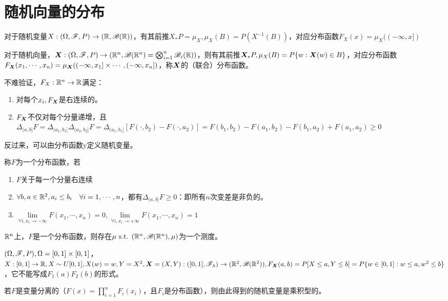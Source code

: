 \documentclass{ctexbook}
\begin{document}
\section{随机向量的分布}
对于随机变量$X:(\Omega,\mathscr{F},P)\to (\mathbb{R},\mathscr{B}(\mathbb{R}))$，有其前推$X_{*}P=\mu_{X}, \mu_{X}(B)=P(X^{-1}(B))$，对应分布函数$F_{X}(x)=\mu_{X}((-\infty,x])$

对于随机向量，$\bm{X}:(\Omega,\mathscr{F},P)\to (\mathbb{R}^{n},\mathscr{B}(\mathbb{R}^{n})=\bigotimes_{i=1}^{n} \mathscr{B}_{i}(\mathbb{R}))$，则有其前推$\bm{X}_{*}P,\mu_{X}(B)=P\{w:\bm{X}(w)\in B\}$，对应分布函数$F_{\bm{X}}(x_{1},\cdots, x_{n})=\mu_{\bm{X}}((-\infty,x_{1}]\times \cdots, (-\infty,x_{n}])$，称$\bm{X}$的（联合）分布函数。

不难验证，$F_{X}:\mathbb{R}^{n}\to\mathbb{R}$满足：
\begin{enumerate}
\item 对每个$x_{i}, F_{\bm{X}}$是右连续的。
\item $F_{\bm{X}}$不仅对每个分量递增，且$\Delta_{(a,b]}F=\Delta_{(a_{1},b_{1}]}\Delta_{(a_{2},b_{2}]}F=\Delta_{(a_{1},b_{1}]}[F(\cdot,b_{2})-F(\cdot,a_{2})]=F(b_{1},b_{2})-F(a_{1},b_{2})-F(b_{1},a_{2})+F(a_{1},a_{2})\geq 0$
\end{enumerate}

反过来，可以由分布函数y定义随机变量。

\begin{Def}
  称$F$为一个分布函数，若
  \begin{enumerate}
  \item $F$关于每一个分量右连续
  \item $\forall b,a\in\mathbb{R}^{2},a_{i}\leq b_{i}\quad\forall i=1,\cdots,n$，都有$\Delta_{(a,b]}F\geq 0$：即所有$n$次变差是非负的。
  \item $\lim\limits_{\forall i,x_{i}\to -\infty}F(x_{1},\cdots,x_{n})=0,\lim\limits_{\forall i,x_{i}\to +\infty}F(x_{1},\cdots,x_{n})=1$
  \end{enumerate}
\end{Def}

\begin{Eg}
  $\mathbb{R}^{n}$上，$F$是一个分布函数，则存在$\mu\text{ s.t. }(\mathbb{R}^{n},\mathscr{B}(\mathbb{R}^{n}),\mu)$为一个测度。
\end{Eg}
\begin{Eg}[$F$不总是乘积型的]
  $(\Omega,\mathscr{F},P),\Omega=[0,1]\times[0,1]$，$X:[0,1]\to\mathbb{R},X\sim U[0,1],X(w)=w, Y=X^{2},\bm{X}=(X,Y):([0,1],\mathscr{F}_{\lambda})\to(\mathbb{R}^{2},\mathscr{B}(\mathbb{R}^{2})), F_{\bm{X}}(a,b)=P[X\leq a, Y\leq b]=P\{w\in [0,1]:w\leq a,w^{2}\leq b\}$，它不能写成$F_{1}(a)F_{2}(b)$的形式。
\end{Eg}

\begin{Rmk}
  若$F$是变量分离的（$F(x)=\prod_{i=1}^{n}F_{i}(x_{i})$，且$F_{i}$是分布函数），则由此得到的随机变量是乘积型的。
\end{Rmk}
\end{document}
